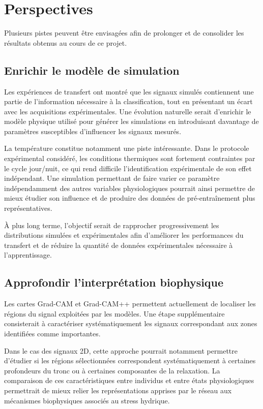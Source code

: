\documentclass[12pt,a4paper,twoside]{article}
\begin{document}
\section{Perspectives}
\label{sec:perspectives}

Plusieurs pistes peuvent être envisagées afin de prolonger et de consolider les
résultats obtenus au cours de ce projet.

\subsection{Enrichir le modèle de simulation}

Les expériences de transfert ont montré que les signaux simulés contiennent une
partie de l'information nécessaire à la classification, tout en présentant un
écart avec les acquisitions expérimentales. Une évolution naturelle serait
d'enrichir le modèle physique utilisé pour générer les simulations en
introduisant davantage de paramètres susceptibles d'influencer les signaux
mesurés.

La température constitue notamment une piste intéressante. Dans le protocole
expérimental considéré, les conditions thermiques sont fortement contraintes
par le cycle jour/nuit, ce qui rend difficile l'identification expérimentale de
son effet indépendant. Une simulation permettant de faire varier ce paramètre
indépendamment des autres variables physiologiques pourrait ainsi permettre de
mieux étudier son influence et de produire des données de pré-entraînement plus
représentatives.

À plus long terme, l'objectif serait de rapprocher progressivement les
distributions simulées et expérimentales afin d'améliorer les performances du
transfert et de réduire la quantité de données expérimentales nécessaire à
l'apprentissage.

\subsection{Approfondir l'interprétation biophysique}

Les cartes Grad-CAM et Grad-CAM++ permettent actuellement de localiser les
régions du signal exploitées par les modèles. Une étape supplémentaire
consisterait à caractériser systématiquement les signaux correspondant aux
zones identifiées comme importantes.

Dans le cas des signaux 2D, cette approche pourrait notamment permettre
d'étudier si les régions sélectionnées correspondent systématiquement à
certaines profondeurs du tronc ou à certaines composantes de la relaxation.
La comparaison de ces caractéristiques entre individus et entre états
physiologiques permettrait de mieux relier les représentations apprises par le
réseau aux mécanismes biophysiques associés au stress hydrique.
\end{document}
